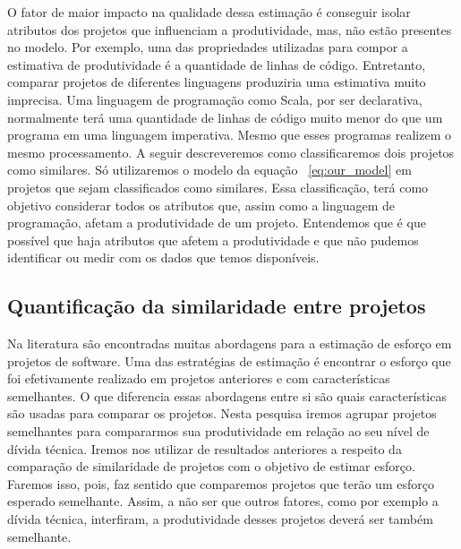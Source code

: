 O fator de maior impacto na qualidade dessa estimação é conseguir isolar atributos dos projetos que influenciam a produtividade, mas, não estão presentes no modelo. Por exemplo, uma das propriedades utilizadas para compor a estimativa de produtividade é a quantidade de linhas de código. Entretanto, comparar projetos de diferentes linguagens produziria uma estimativa muito imprecisa. Uma linguagem de programação como Scala, por ser declarativa, normalmente terá uma quantidade de linhas de código muito menor do que um programa em uma linguagem imperativa. Mesmo que esses programas realizem o mesmo processamento.  A seguir descreveremos como classificaremos dois projetos como similares. Só utilizaremos o modelo  da equação ~\ref{eq:our_model} em projetos que sejam classificados como similares. Essa classificação, terá como objetivo considerar todos os atributos que, assim como a linguagem de programação, afetam a produtividade de um projeto. Entendemos que é que possível que haja atributos que afetem a produtividade e que não pudemos identificar ou medir com os dados que temos disponíveis.
 

\subsection{Quantificação da similaridade entre projetos}

Na literatura são encontradas muitas abordagens para a estimação de esforço em projetos de software. Uma das estratégias de estimação é encontrar o esforço que foi efetivamente realizado em projetos anteriores e com características semelhantes. O que diferencia essas abordagens entre si são quais características são usadas para comparar os projetos.  Nesta pesquisa iremos agrupar projetos semelhantes para compararmos sua produtividade em relação ao seu nível de dívida técnica. Iremos nos utilizar de resultados anteriores a respeito da comparação de similaridade de projetos com o objetivo de estimar esforço. Faremos isso, pois, faz sentido que comparemos projetos que terão um esforço esperado semelhante. Assim, a não ser que outros fatores, como por exemplo a dívida técnica, interfiram,  a produtividade desses projetos deverá ser também semelhante. 


